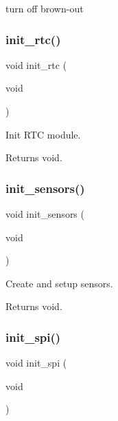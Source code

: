 turn off brown-\/out \mbox{\label{rmap_8ino_ab985cc69f5f573113405b4f118c96d33}} 
\subsubsection{\texorpdfstring{init\+\_\+rtc()}{init\_rtc()}}
{\footnotesize\ttfamily void init\+\_\+rtc (\begin{DoxyParamCaption}\item[{void}]{ }\end{DoxyParamCaption})}



Init R\+TC module. 

\begin{DoxyReturn}{Returns}
void. 
\end{DoxyReturn}
\mbox{\label{rmap_8ino_ac74850003fab6eb3269bfe043d0f939c}} 
\subsubsection{\texorpdfstring{init\+\_\+sensors()}{init\_sensors()}}
{\footnotesize\ttfamily void init\+\_\+sensors (\begin{DoxyParamCaption}\item[{void}]{ }\end{DoxyParamCaption})}



Create and setup sensors. 

\begin{DoxyReturn}{Returns}
void. 
\end{DoxyReturn}
\mbox{\label{rmap_8ino_a8eb9780a3438ec02c70314744f91f3c7}} 
\subsubsection{\texorpdfstring{init\+\_\+spi()}{init\_spi()}}
{\footnotesize\ttfamily void init\+\_\+spi (\begin{DoxyParamCaption}\item[{void}]{ }\end{DoxyParamCaption})}



